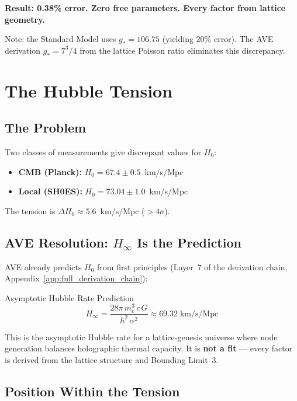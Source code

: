 \medskip\noindent
\textbf{Result: 0.38\% error.  Zero free parameters.  Every factor
from lattice geometry.}

\medskip\noindent
Note: the Standard Model uses $g_* = 106.75$ (yielding 20\% error).
The AVE derivation $g_* = 7^3/4$ from the lattice Poisson ratio
eliminates this discrepancy.

\section{The Hubble Tension}
\label{sec:hubble_tension}

\subsection{The Problem}

Two classes of measurements give discrepant values for $H_0$:
\begin{itemize}
    \item \textbf{CMB (Planck):} $H_0 = 67.4 \pm 0.5$~km/s/Mpc
    \item \textbf{Local (SH0ES):} $H_0 = 73.04 \pm 1.0$~km/s/Mpc
\end{itemize}
The tension is $\Delta H_0 \approx 5.6$~km/s/Mpc ($>4\sigma$).

\subsection{AVE Resolution: $H_\infty$ Is the Prediction}

AVE already predicts $H_0$ from first principles (Layer~7
of the derivation chain, Appendix~\ref{app:full_derivation_chain}):
\begin{resultbox}{Asymptotic Hubble Rate Prediction}
\begin{equation}
    H_\infty = \frac{28\pi\,m_e^3\,c\,G}{\hbar^2\,\alpha^2}
    \approx 69.32\;\text{km/s/Mpc}
    \label{eq:H_inf_pred}
\end{equation}
\end{resultbox}

This is the asymptotic Hubble rate for a lattice-genesis universe
where node generation balances holographic thermal capacity.
It is \textbf{not a fit} --- every factor is derived from the
lattice structure and Bounding Limit~3.

\subsection{Position Within the Tension}

